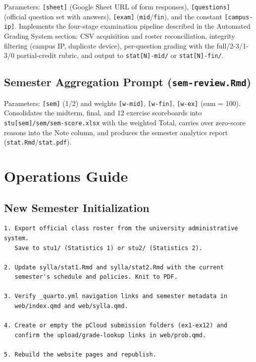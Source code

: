 \documentclass[
]{article}
\begin{document}
Parameters: \texttt{{[}sheet{]}} (Google Sheet URL of form responses),
\texttt{{[}questions{]}} (official question set with answers),
\texttt{{[}exam{]}} (\texttt{mid}/\texttt{fin}), and the constant
\texttt{{[}campus-ip{]}}. Implements the four-stage examination pipeline
described in the Automated Grading System section: CSV acquisition and
roster reconciliation, integrity filtering (campus IP, duplicate
device), per-question grading with the full/2-3/1-3/0 partial-credit
rubric, and output to \texttt{stat{[}N{]}-mid/} or
\texttt{stat{[}N{]}-fin/}.

\subsection{\texorpdfstring{Semester Aggregation Prompt
(\texttt{sem-review.Rmd})}{Semester Aggregation Prompt (sem-review.Rmd)}}\label{semester-aggregation-prompt-sem-review.rmd}

Parameters: \texttt{{[}sem{]}} (1/2) and weights \texttt{{[}w-mid{]}},
\texttt{{[}w-fin{]}}, \texttt{{[}w-ex{]}} (sum = 100). Consolidates the
midterm, final, and 12 exercise scoreboards into
\texttt{stu{[}sem{]}/sem/sem-score.xlsx} with the weighted Total,
carries over zero-score reasons into the Note column, and produces the
semester analytics report (\texttt{stat.Rmd}/\texttt{stat.pdf}).

\newpage

\section{Operations Guide}\label{operations-guide}

\subsection{New Semester
Initialization}\label{new-semester-initialization}

\begin{verbatim}
1. Export official class roster from the university administrative system.
   Save to stu1/ (Statistics 1) or stu2/ (Statistics 2).

2. Update sylla/stat1.Rmd and sylla/stat2.Rmd with the current
   semester's schedule and policies. Knit to PDF.

3. Verify _quarto.yml navigation links and semester metadata in
   web/index.qmd and web/sylla.qmd.

4. Create or empty the pCloud submission folders (ex1-ex12) and
   confirm the upload/grade-lookup links in web/prob.qmd.

5. Rebuild the website pages and republish.
\end{verbatim}
\end{document}
